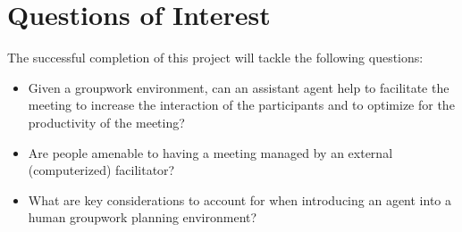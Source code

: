 \documentclass[final,authoryear,11pt,times]{elsarticle}
\begin{document}
\section{Questions of Interest}
	\label{sec:question_o_i}
	The successful completion of this project will tackle the following questions:
	\begin{itemize}[noitemsep]
		\item Given a groupwork environment, can an assistant agent help to facilitate the meeting to increase the interaction of the participants and to optimize for the productivity of the meeting?
		\item Are people amenable to having a meeting managed by an external (computerized) facilitator?
		\item What are key considerations to account for when introducing an agent into a human groupwork planning environment?
	\end{itemize}

\pagebreak
\end{document}
